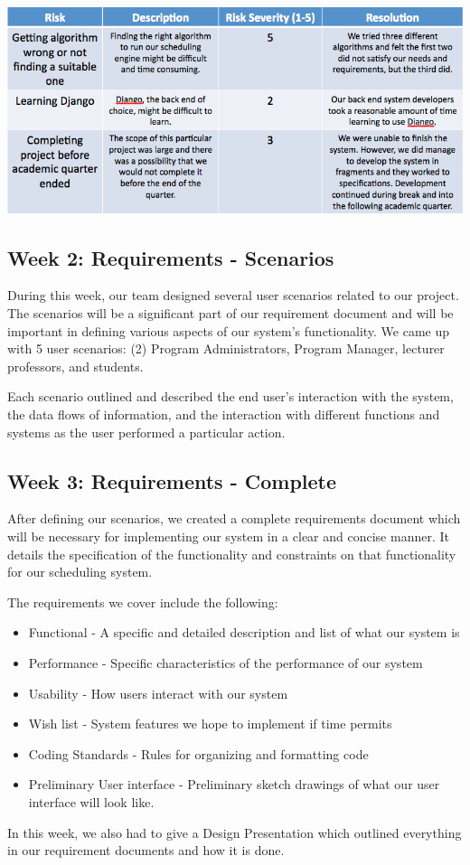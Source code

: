 \documentclass[12pt]{article}
\begin{document}
\begin{enumerate}
\includegraphics[scale=0.45]{risktable.png}

\subsection*{Week 2: Requirements - Scenarios}

During this week, our team designed several user scenarios related to our project. The scenarios will be a significant part of our requirement document and will be important in defining various aspects of our system's functionality. We came up with 5 user scenarios:  (2) Program Administrators, Program Manager, lecturer professors, and students. 

Each scenario outlined and described the end user's interaction with the system, the data flows of information, and the interaction with different functions and systems as the user performed a particular action. 

\subsection*{Week 3: Requirements - Complete}

After defining our scenarios, we created a complete requirements document which will be necessary for implementing our system in a clear and concise manner. It details the specification of the functionality and constraints on that functionality for our scheduling system. 

The requirements we cover include the following:
\begin{itemize}
\item Functional - A specific and detailed description and list of what our system is
\item Performance - Specific characteristics of the performance of our system
\item Usability - How users interact with our system
\item Wish list - System features we hope to implement if time permits
\item Coding Standards - Rules for organizing and formatting code
\item Preliminary User interface - Preliminary sketch drawings of what our user interface will look like. 
\end{itemize}
In this week, we also had to give a Design Presentation which outlined everything in our requirement documents and how it is done. 


\end{enumerate}
\end{document}

